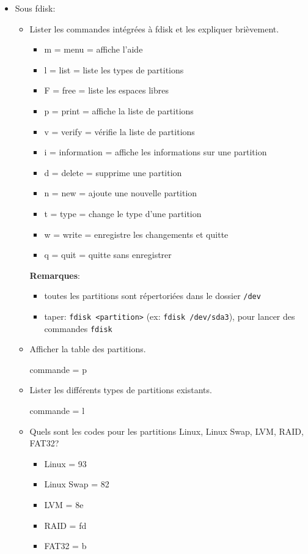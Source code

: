 \documentclass[a4paper]{article}
\begin{document}
\begin{itemize}
\item Sous fdisk:
\begin{itemize}
    \item Lister les commandes intégrées à fdisk et les expliquer brièvement.
    \begin{example}
        \begin{itemize}
            \item m = menu = affiche l'aide
            \item l = list = liste les types de partitions
            \item F = free = liste les espaces libres
            \item p = print = affiche la liste de partitions
            \item v = verify = vérifie la liste de partitions
            \item i = information = affiche les informations sur une partition
            \item d = delete = supprime une partition
            \item n = new = ajoute une nouvelle partition
            \item t = type = change le type d'une partition
            \item w = write = enregistre les changements et quitte
            \item q = quit = quitte sans enregistrer
        \end{itemize}
        \textbf{Remarques}:
        \begin{itemize}
            \item toutes les partitions sont répertoriées dans le dossier \texttt{/dev}
            \item taper: \texttt{fdisk <partition>} (ex: \texttt{fdisk /dev/sda3}), pour lancer des commandes \texttt{fdisk}
        \end{itemize}
    \end{example}
    \item Afficher la table des partitions.
    \begin{example}
        commande = p
    \end{example}
    \item Lister les différents types de partitions existants.
    \begin{example}
        commande = l
    \end{example}
    \item Quels sont les codes pour les partitions Linux, Linux Swap, LVM, RAID, FAT32?
    \begin{example}
        \begin{itemize}
            \item Linux = 93
            \item Linux Swap = 82
            \item LVM = 8e
            \item RAID = fd
            \item FAT32 = b
        \end{itemize}
    \end{example}
\end{itemize}


\end{itemize}
\end{document}
